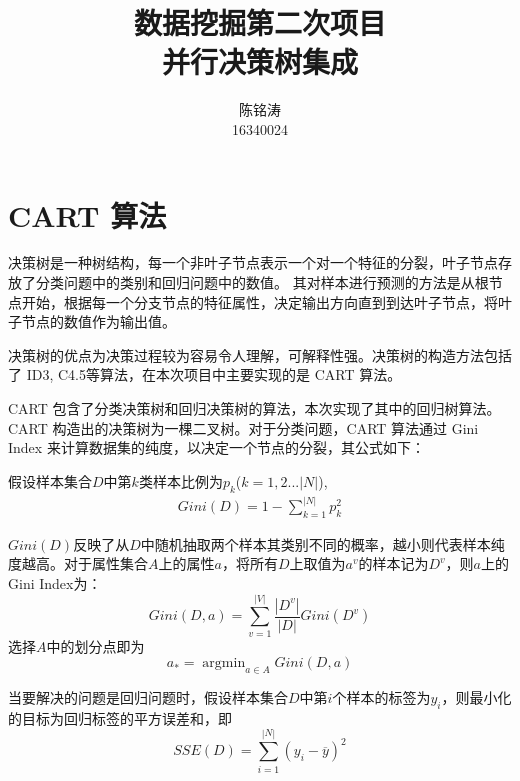 \documentclass[12pt]{article}
\begin{document}
\author{陈铭涛\\16340024}
\title{数据挖掘第二次项目\\
    \large{并行决策树集成}}
\maketitle

\medskip


\section{CART 算法}

决策树是一种树结构，每一个非叶子节点表示一个对一个特征的分裂，叶子节点存放了分类问题中的类别和回归问题中的数值。
其对样本进行预测的方法是从根节点开始，根据每一个分支节点的特征属性，决定输出方向直到到达叶子节点，将叶子节点的数值作为输出值。

决策树的优点为决策过程较为容易令人理解，可解释性强。决策树的构造方法包括了 ID3, C4.5等算法，在本次项目中主要实现的是 CART 算法。

CART 包含了分类决策树和回归决策树的算法，本次实现了其中的回归树算法。CART 构造出的决策树为一棵二叉树。对于分类问题，CART 算法通过 Gini Index 来计算数据集的纯度，以决定一个节点的分裂，其公式如下：

假设样本集合$D$中第$k$类样本比例为$p_k$($k=1,2...|N|$),
\begin{equation}
    \begin{aligned}
    Gini(D)=1-\sum_{k=1}^{|N|}p_k^2
    \end{aligned}
\end{equation}

$Gini(D)$反映了从$D$中随机抽取两个样本其类别不同的概率，越小则代表样本纯度越高。对于属性集合$A$上的属性$a$，将所有$D$上取值为$a^v$的样本记为$D^v$，则$a$上的Gini Index为：
\begin{equation}
    Gini(D, a)=\sum_{v=1}^{|V|}\frac{|D^v|}{|D|}Gini(D^v)
\end{equation}
选择$A$中的划分点即为
\begin{equation}
    a_*=\mathop{\arg\min}_{a\in A}Gini(D,a)
\end{equation}

当要解决的问题是回归问题时，假设样本集合$D$中第$i$个样本的标签为$y_i$，则最小化的目标为回归标签的平方误差和，即
\begin{equation}
    SSE(D)=\sum_{i=1}^{|N|}(y_i-\overline{y})^2
\end{equation}
\end{document}
